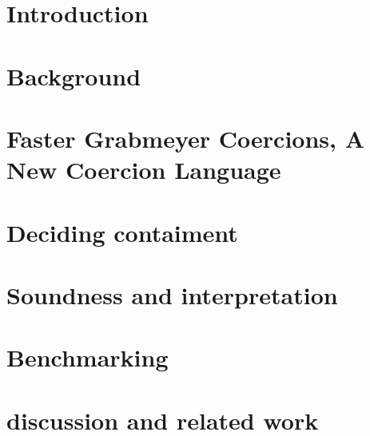 \documentclass[runningheads]{llncs}
\begin{document}
 \section{Introduction}\label{sec:introduction}
  

\section{Background}\label{sec:background}


\section{Faster Grabmeyer Coercions, A New Coercion Language}\label{sec:language}


\section{Deciding contaiment}\label{sec:decide}


\section{Soundness and interpretation} \label{sec:soundness}


\section{Benchmarking}


\section{discussion and related work}\label{sec:discussion}



  
\end{document}
